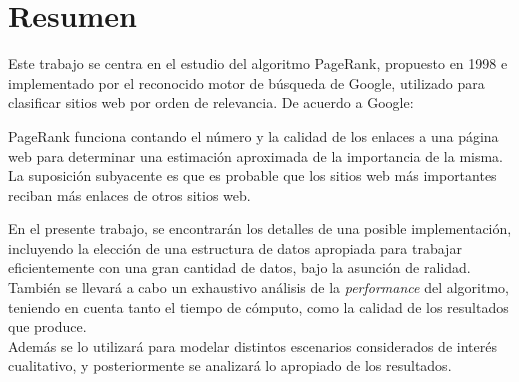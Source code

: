 \section{Resumen}
Este trabajo se centra en el estudio del algoritmo PageRank, propuesto en 1998 e implementado por el reconocido motor de búsqueda de Google, utilizado para clasificar sitios web por orden de relevancia. De acuerdo a Google: \\
\begin{displayquote}
PageRank funciona contando el n\'umero y la calidad de los enlaces a una p\'agina web para determinar una estimaci\'on aproximada de la importancia de la misma. La suposici\'on subyacente es que es probable que los sitios web m\'as importantes reciban m\'as enlaces de otros sitios web. \\
\end{displayquote}
	En el presente trabajo, se encontrar\'an los detalles de una posible implementaci\'on, incluyendo la elecci\'on de una estructura de datos apropiada para trabajar eficientemente con una gran cantidad de datos, bajo la asunci\'on de ralidad. \\
	También se llevar\'a a cabo un exhaustivo an\'alisis de la \textit{performance} del algoritmo, teniendo en cuenta tanto el tiempo de c\'omputo, como la calidad de los resultados que produce. \\
	Adem\'as se lo utilizar\'a para modelar distintos escenarios considerados de inter\'es cualitativo, y posteriormente se analizar\'a lo apropiado de los resultados.